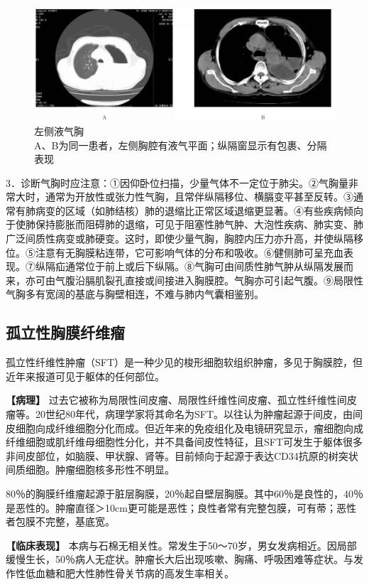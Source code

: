 \begin{figure}[!htbp]
 \centering
 \includegraphics[width=.7\textwidth,height=\textheight,keepaspectratio]{./images/Image00243.jpg}
 \captionsetup{justification=centering}
 \caption{左侧液气胸\\{\small A、B为同一患者，左侧胸腔有液气平面；纵隔窗显示有包裹、分隔表现}}
 \label{fig9-45}
  \end{figure} 

3．诊断气胸时应注意：①因仰卧位扫描，少量气体不一定位于肺尖。②气胸量非常大时，通常为开放性或张力性气胸，且常伴纵隔移位、横膈变平甚至反转。③通常有肺病变的区域（如肺结核）肺的退缩比正常区域退缩更显著。④有些疾病倾向于使肺保持膨胀而阻碍肺的退缩，可见于阻塞性肺气肿、大泡性疾病、肺实变、肺广泛间质性病变或肺硬变。这时，即使少量气胸，胸腔内压力亦升高，并使纵隔移位。⑤注意有无胸膜粘连带，它可影响气体的分布和吸收。⑥健侧肺可呈充血表现。⑦纵隔疝通常位于前上或后下纵隔。⑧气胸可由间质性肺气肿从纵隔发展而来，亦可由气腹沿膈肌裂孔直接或间接进入胸膜腔。气胸亦可引起气腹。⑨局限性气胸多有宽阔的基底与胸壁相连，不难与肺内气囊相鉴别。

\subsection{孤立性胸膜纤维瘤}

孤立性纤维性肿瘤（SFT）是一种少见的梭形细胞软组织肿瘤，多见于胸膜腔，但近年来报道可见于躯体的任何部位。

\textbf{【病理】}
过去它被称为局限性间皮瘤、局限性纤维性间皮瘤、孤立性纤维性间皮瘤等。20世纪80年代，病理学家将其命名为SFT。以往认为肿瘤起源于间皮，由间皮细胞向成纤维细胞分化而成。但近年来的免疫组化及电镜研究显示，瘤细胞向成纤维细胞或肌纤维母细胞性分化，并不具备间皮性特征，且SFT可发生于躯体很多非间皮部位，如脑膜、甲状腺、肾等。目前倾向于起源于表达CD34抗原的树突状间质细胞。肿瘤细胞核多形性不明显。

80％的胸膜纤维瘤起源于脏层胸膜，20％起自壁层胸膜。其中60％是良性的，40％是恶性的。肿瘤直径＞10cm更可能是恶性；良性者常有完整包膜，可有蒂；恶性者包膜不完整，基底宽。

\textbf{【临床表现】}
本病与石棉无相关性。常发生于50～70岁，男女发病相近。因局部缓慢生长，50％病人无症状。肿瘤长大后出现咳嗽、胸痛、呼吸困难等症状。与发作性低血糖和肥大性肺性骨关节病的高发生率相关。

